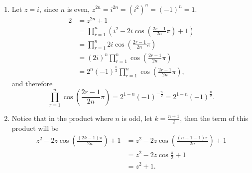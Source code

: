 \begin{enumerate}
    \item Let \(z = i\), since \(n\) is even, \(z^{2n} = i^{2n} = (i^2)^n = (-1)^n = 1\).
          \begin{align*}
              2 & = z^{2n} + 1                                                                          \\
                & = \prod_{r = 1}^{n} \left(i^2 - 2i \cos \left(\frac{2r - 1}{2n} \pi\right) + 1\right) \\
                & = \prod_{r = 1}^{n} 2i \cos \left(\frac{2r - 1}{2n} \pi\right)                        \\
                & = (2i)^n \prod_{r = 1}^{n} \cos \left(\frac{2r - 1}{2n} \pi\right)                    \\
                & = 2^n (-1)^{\frac{n}{2}} \prod_{r = 1}^{n} \cos \left(\frac{2r - 1}{2n} \pi\right),
          \end{align*}
          and therefore
          \[
              \prod_{r = 1}^{n} \cos \left(\frac{2r - 1}{2n} \pi\right) = 2^{1 - n} (-1)^{-\frac{n}{2}} = 2^{1 - n} (-1)^{\frac{n}{2}}.
          \]
    \item Notice that in the product where \(n\) is odd, let \(k = \frac{n + 1}{2}\), then the term of this product will be
          \begin{align*}
              z^2 - 2z \cos \left(\frac{(2k - 1) \pi}{2n}\right) + 1 & = z^2 - 2z \cos \left(\frac{(n + 1 - 1)\pi}{2n}\right) + 1 \\
                                                                     & = z^2 - 2z \cos \frac{\pi}{2} + 1                          \\
                                                                     & = z^2 + 1.
          \end{align*}


\end{enumerate}
